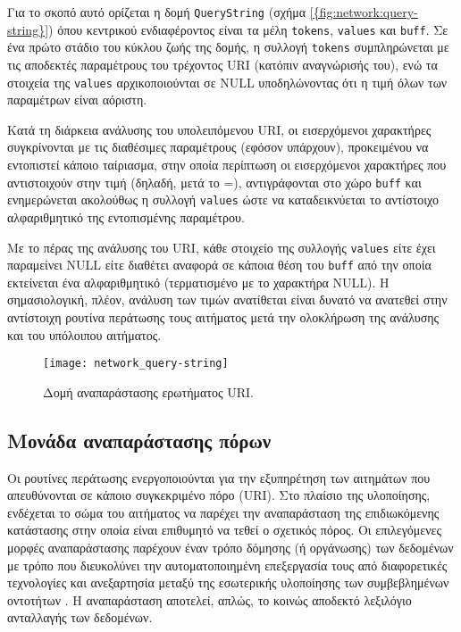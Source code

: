 Για το σκοπό αυτό ορίζεται η δομή \verb~QueryString~ (σχήμα
\ref{{fig:network:query-string}}) όπου κεντρικού ενδιαφέροντος είναι τα μέλη
\verb~tokens~, \verb~values~ και \verb~buff~. Σε ένα πρώτο στάδιο του κύκλου
ζωής της δομής, η συλλογή \verb~tokens~ συμπληρώνεται με τις αποδεκτές
παραμέτρους του τρέχοντος URI (κατόπιν αναγνώρισής του), ενώ τα στοιχεία της
\verb~values~ αρχικοποιούνται σε NULL υποδηλώνοντας ότι η τιμή όλων των
παραμέτρων είναι αόριστη.

Κατά τη διάρκεια ανάλυσης του υπολειπόμενου URI, οι εισερχόμενοι χαρακτήρες
συγκρίνονται με τις διαθέσιμες παραμέτρους (εφόσον υπάρχουν), προκειμένου να
εντοπιστεί κάποιο ταίριασμα, στην οποία περίπτωση οι εισερχόμενοι χαρακτήρες που
αντιστοιχούν στην τιμή (δηλαδή, μετά το =), αντιγράφονται στο χώρο \verb~buff~
και ενημερώνεται ακολούθως η συλλογή \verb~values~ ώστε να καταδεικνύεται το
αντίστοιχο αλφαριθμητικό της εντοπισμένης παραμέτρου.

Με το πέρας της ανάλυσης του URI, κάθε στοιχείο της συλλογής \verb~values~
είτε έχει παραμείνει NULL είτε διαθέτει αναφορά σε κάποια θέση του \verb~buff~
από την οποία εκτείνεται ένα αλφαριθμητικό (τερματισμένο με το χαρακτήρα NULL).
Η σημασιολογική, πλέον, ανάλυση των τιμών ανατίθεται είναι δυνατό να ανατεθεί
στην αντίστοιχη ρουτίνα περάτωσης τους αιτήματος μετά την ολοκλήρωση της
ανάλυσης και του υπόλοιπου αιτήματος.

\begin{figure}
    \caption{Δομή αναπαράστασης ερωτήματος URI.
    \label{fig:network:query-string}}
    \begin{center}
    \texttt{[image: network\_query-string]}
    \end{center}
\end{figure}

\subsection{Μονάδα αναπαράστασης πόρων}
\label{subsec:network:representation}

Οι ρουτίνες περάτωσης ενεργοποιούνται για την εξυπηρέτηση των αιτημάτων που
απευθύνονται σε κάποιο συγκεκριμένο πόρο (URI). Στο πλαίσιο της υλοποίησης,
ενδέχεται το σώμα του αιτήματος να παρέχει την αναπαράσταση της επιδιωκόμενης
κατάστασης στην οποία είναι επιθυμητό να τεθεί ο σχετικός πόρος. Οι επιλεγόμενες
μορφές αναπαράστασης παρέχουν έναν τρόπο δόμησης (ή οργάνωσης) των δεδομένων με
τρόπο που διευκολύνει την αυτοματοποιημένη επεξεργασία τους από διαφορετικές
τεχνολογίες και ανεξαρτησία μεταξύ της εσωτερικής υλοποίησης των συμβεβλημένων
οντοτήτων \parencite[90--92]{fielding00}. Η αναπαράσταση αποτελεί, απλώς, το
κοινώς αποδεκτό λεξιλόγιο ανταλλαγής των δεδομένων.

